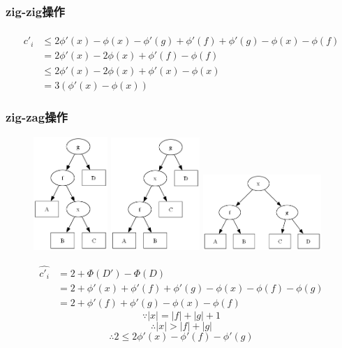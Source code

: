 \documentclass[utf8]{ctexbeamer}
\begin{document}
    \begin{frame}
        \frametitle{zig-zig操作}
        \begin{align}
            \hat{c'_i}&\le2\phi'(x)-\phi(x)-\phi'(g)+\phi'(f)+\phi'(g)-\phi(x)-\phi(f)\nonumber\\
                      &=2\phi'(x)-2\phi(x)+\phi'(f)-\phi(f)\nonumber\\
                      &\le2\phi'(x)-2\phi(x)+\phi'(x)-\phi(x)\nonumber\\
                      &=3(\phi'(x)-\phi(x))\nonumber
        \end{align}
    \end{frame}

    \begin{frame}
        \frametitle{zig-zag操作}
        \begin{figure}
            \includegraphics[width=0.25\textwidth]{images/splay_zig-zag0.png}
            \includegraphics[width=0.3\textwidth]{images/splay_zig-zag1.png}
            \includegraphics[width=0.4\textwidth]{images/splay_zig-zag2.png}
        \end{figure}
        \begin{align}
            \hat{c'_i}&=2+\Phi(D')-\Phi(D)\nonumber\\
                      &=2+\phi'(x)+\phi'(f)+\phi'(g)-\phi(x)-\phi(f)-\phi(g)\nonumber\\
                      &=2+\phi'(f)+\phi'(g)-\phi(x)-\phi(f)\nonumber
        \end{align}
        \[\because\left\lvert x\right\rvert=\left\lvert f\right\rvert+\left\lvert g\right\rvert+1\]
        \[\therefore\left\lvert x\right\rvert>\left\lvert f\right\rvert+\left\lvert g\right\rvert\]
        \[\therefore2\le2\phi'(x)-\phi'(f)-\phi'(g)\]
    \end{frame}
\end{document}
